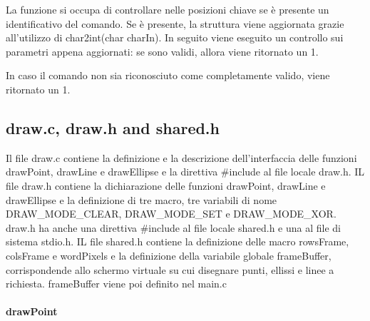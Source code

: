 \documentclass[a4paper]{article}
\begin{document}
			La funzione si occupa di controllare nelle posizioni chiave se è presente un identificativo del comando.
			Se è presente, la struttura viene aggiornata grazie all'utilizzo di char2int(char charIn).
			In seguito viene eseguito un controllo sui parametri appena aggiornati: se sono validi, allora viene
			ritornato un 1.

			In caso il comando non sia riconosciuto come completamente valido, viene ritornato un 1.
      \subsection{draw.c, draw.h and shared.h}
      Il file draw.c contiene la definizione e la descrizione dell'interfaccia delle funzioni drawPoint, drawLine e drawEllipse e la direttiva \#include al file locale draw.h.
      IL file draw.h contiene la dichiarazione delle funzioni drawPoint, drawLine e drawEllipse e la definizione di tre macro, tre variabili di nome DRAW\_MODE\_CLEAR, DRAW\_MODE\_SET e DRAW\_MODE\_XOR.
      draw.h ha anche una direttiva \#include al file locale shared.h e una al file di sistema stdio.h.
      IL file shared.h contiene la definizione delle macro rowsFrame, colsFrame e wordPixels e la definizione della variabile globale frameBuffer,
      corrispondende allo schermo virtuale su cui disegnare punti, ellissi e linee a richiesta. frameBuffer viene poi definito nel main.c
		\paragraph{drawPoint}
\end{document}
